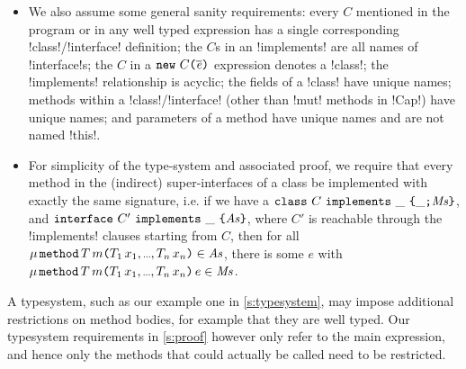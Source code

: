 \begin{itemize}
	\item We also assume some general sanity requirements:
	every $C$ mentioned in the program or in any well typed expression has a single corresponding \Q!class!/\Q!interface! definition; the $C$s in an \Q!implements! are all names of \Q!interface!s; the $C$ in a $\texttt{new}\ C\texttt{(}\hspace{0.03ex} \overline{\hspace{-0.03ex}\mathit{e}\hspace{-0.03ex}} \hspace{0.03ex}\texttt{)}$ expression denotes a \Q!class!; the \Q!implements! relationship is acyclic; the fields of a \Q!class! have unique names; 
	methods within a \Q!class!/\Q!interface! (other than \Q!mut! methods in \Q!Cap!) have unique names; and parameters of a method have unique names and are not named \Q!this!.

	\item For simplicity of the type-system and associated proof, we require that every method in the (indirect) super-interfaces of a class be implemented with exactly the same signature, i.e. if we have a $\texttt{class}\ C\ \texttt{implements}\ \_\ \texttt{\{}\_\texttt{;}\mathit{Ms}\texttt{\}}$, and $\texttt{interface}\ C'\ \texttt{implements}\ \_\ \texttt{\{}\mathit{As}\texttt{\}}$, where $C'$ is reachable through the \Q!implements! clauses starting from $C$,
	then for all $\amethod{\mdf}{T}{m}{\drange{T}{x}} \in \As$, there is some $e$ with $\method{\mdf}{T}{m}{\drange{T}{x}}{e} \in \Ms$.
\end{itemize}

A typesystem, such as our example one in \ref{s:typesystem}, may impose additional restrictions on method bodies, for example that they are well typed.
Our typesystem requirements in \ref{s:proof} however only refer to the main expression, and hence only the methods that could actually be called need to be restricted.

